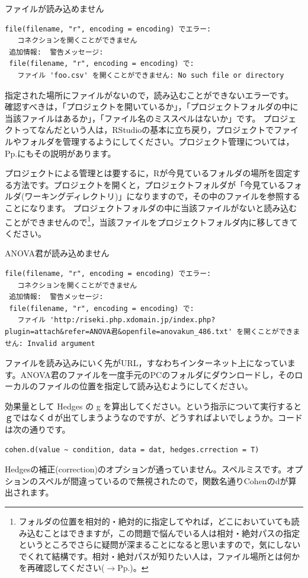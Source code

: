 \documentclass{ltjsbook}
\begin{document}
\begin{FAQ}{ファイルが読み込めません}{}
    \begin{verbatim}
file(filename, "r", encoding = encoding) でエラー:
   コネクションを開くことができません
 追加情報:  警告メッセージ:
 file(filename, "r", encoding = encoding) で:
   ファイル 'foo.csv' を開くことができません: No such file or directory
    \end{verbatim}
指定された場所にファイルがないので，読み込むことができないエラーです。
確認すべきは，「プロジェクトを開いているか」，「プロジェクトフォルダの中に当該ファイルはあるか」，「ファイル名のミススペルはないか」です。
プロジェクトってなんだという人は，RStudioの基本に立ち戻り，プロジェクトでファイルやフォルダを管理するようにしてください。プロジェクト管理については，Pp.\pageref{UnderProject}にもその説明があります。

プロジェクトによる管理とは要するに，Rが今見ているフォルダの場所を固定する方法です。プロジェクトを開くと，プロジェクトフォルダが「今見ているフォルダ(ワーキングディレクトリ)」になりますので，その中のファイルを参照することになります。
プロジェクトフォルダの中に当該ファイルがないと読み込むことができませんので\footnote{フォルダの位置を相対的・絶対的に指定してやれば，どこにおいていても読み込むことはできますが，この問題で悩んでいる人は相対・絶対パスの指定というところでさらに疑問が深まることになると思いますので，気にしないでくれて結構です。相対・絶対パスが知りたい人は，ファイル場所とは何かを再確認してください($\to$Pp.\pageref{filelocale})。}，当該ファイルをプロジェクトフォルダ内に移してきてください。
\end{FAQ}

\begin{FAQ}{ANOVA君が読み込めません}{}
\begin{verbatim}
file(filename, "r", encoding = encoding) でエラー:
   コネクションを開くことができません
 追加情報:  警告メッセージ:
 file(filename, "r", encoding = encoding) で:
   ファイル 'http:/riseki.php.xdomain.jp/index.php?plugin=attach&refer=ANOVA君&openfile=anovakun_486.txt' を開くことができません: Invalid argument
\end{verbatim}
ファイルを読み込みにいく先がURL，すなわちインターネット上になっています。ANOVA君のファイルを一度手元のPCのフォルダにダウンロードし，そのローカルのファイルの位置を指定して読み込むようにしてください。
\end{FAQ}

\begin{FAQ}{効果量として Hedges の g を算出してください。という指示について実行するとｇではなくｄが出てしまうようなのですが、どうすればよいでしょうか。コードは次の通りです。}{}
\begin{verbatim}
cohen.d(value ~ condition, data = dat, hedges.crrection = T)
\end{verbatim}
Hedgesの補正(correction)のオプションが通っていません。スペルミスです。オプションのスペルが間違っているので無視されたので，関数名通りCohenのdが算出されます。
\end{FAQ}
\end{document}
